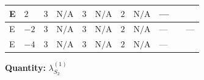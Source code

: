 \documentclass[8pt]{article}
\begin{document}
\begin{landscape}
\begin{longtable}{@{}llcccccc >{\raggedright\arraybackslash}p{0.21\linewidth} >{\raggedright\arraybackslash}p{0.21\linewidth} >{\raggedright\arraybackslash}p{0.21\linewidth}@{}}
\midrule
E & $2$ & $3$ & $\text{N/A}$ & $3$ & $\text{N/A}$ & $2$ & $\text{N/A}$ & --- & \scriptsize\adjustbox{max width=\linewidth}{$\begin{gathered} 22 {g_2}^4\end{gathered}$} & \scriptsize\adjustbox{max width=\linewidth}{$\begin{gathered} +{g_1}^2 \left(32 {g_2}^2-48 {\lambda_{S_2}^{(1)}}\right)\end{gathered}$} \\
\midrule
E & $-2$ & $3$ & $\text{N/A}$ & $3$ & $\text{N/A}$ & $2$ & $\text{N/A}$ & --- & \scriptsize\adjustbox{max width=\linewidth}{$\begin{gathered} +22 {g_2}^4\end{gathered}$} & --- \\
\midrule
E & $-4$ & $3$ & $\text{N/A}$ & $3$ & $\text{N/A}$ & $2$ & $\text{N/A}$ & --- & \scriptsize\adjustbox{max width=\linewidth}{$\begin{gathered} 22 {g_2}^4\end{gathered}$} & \scriptsize\adjustbox{max width=\linewidth}{$\begin{gathered} +{g_1}^2 \left(8 {g_2}^2-12 {\lambda_{S_2}^{(1)}}\right)\end{gathered}$} \\
\midrule
\bottomrule
\end{longtable}
\clearpage
\noindent\textbf{Quantity: }$\lambda_{S_2}^{(1)}$\par\smallskip

\end{landscape}
\end{document}
